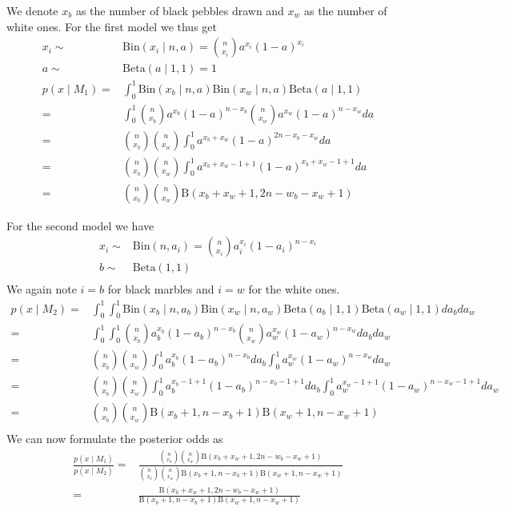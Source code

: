 \documentclass{article}
\begin{document}
We denote $x_b$ as the number of black pebbles drawn and $x_w$ as the number of white ones. For the first model we thus get
\begin{align}
	x_i \sim& \text{Bin}(x_i \mid n,a) = {n \choose x_i}a^{x_i}(1-a)^{x_i}\\
	a \sim& \text{Beta}(a \mid 1,1) = 1 \\
	p(x\mid M_1) =&  \int_0^1 \text{Bin}(x_b \mid n,a)\text{Bin}(x_w \mid n,a)\text{Beta}(a \mid 1,1)\\
	=& \int_0^1 {n \choose x_b}a^{x_b}(1-a)^{n-x_b}{n \choose x_w}a^{x_w}(1-a)^{n-x_w} da\\
	=& {n \choose x_b}{n \choose x_w}\int_0^1 a^{x_b+x_w}(1-a)^{2n-x_b-x_w} da \\
	=& {n \choose x_b}{n \choose x_w}\int_0^1 a^{x_b+x_w-1+1}(1-a)^{x_b+x_w-1+1} da\\
	=& {n \choose x_b}{n \choose x_w}\text{B}(x_b+x_w+1, 2n - w_b-x_w + 1)
\end{align}

For the second model we have 
\begin{align}
	x_i \sim& \text{Bin}(n,a_i) = {n \choose x_i}a_i^{x_i}(1-a_i)^{n-x_i} \\
	b \sim& \text{Beta}(1,1)\\
\end{align}
We again note $i=b$ for black marbles and $i=w$ for the white ones.
\begin{align}
	p(x\mid M_2) =&  \int_0^1\int_0^1 \text{Bin}(x_b \mid n,a_b)\text{Bin}(x_w \mid n,a_w)\text{Beta}(a_b \mid 1,1)\text{Beta}(a_w \mid 1,1)da_bda_w\\
	=&  \int_0^1\int_0^1 {n \choose x_b}a_b^{x_b}(1-a_b)^{n-x_b}{n \choose x_w}a_w^{x_w}(1-a_w)^{n-x_w}da_bda_w\\
	=&  {n \choose x_b}{n \choose x_w}\int_0^1a_b^{x_b}(1-a_b)^{n-x_b} da_b\int_0^1 a_w^{x_w}(1-a_w)^{n-x_w}da_w\\
	=&  {n \choose x_b}{n \choose x_w}\int_0^1a_b^{x_b-1+1}(1-a_b)^{n-x_b-1+1} da_b\int_0^1 a_w^{x_w-1+1}(1-a_w)^{n-x_w-1+1}da_w\\
	=&  {n \choose x_b}{n \choose x_w}\text{B}(x_b+1,n-x_b+1) \text{B}(x_w+1,n-x_w+1)\\
\end{align}
We can now formulate the posterior odds as 
\begin{align}
	\frac{p(x\mid M_1)}{p(x\mid M_2)} =& \frac{{n \choose x_b}{n \choose x_w}\text{B}(x_b+x_w+1, 2n - w_b-x_w + 1)}{{n \choose x_b}{n \choose x_w}\text{B}(x_b+1,n-x_b+1) \text{B}(x_w+1,n-x_w+1)}\\
	=& \frac{\text{B}(x_b+x_w+1, 2n - w_b-x_w + 1)}{\text{B}(x_b+1,n-x_b+1) \text{B}(x_w+1,n-x_w+1)}
\end{align}
\end{document}

